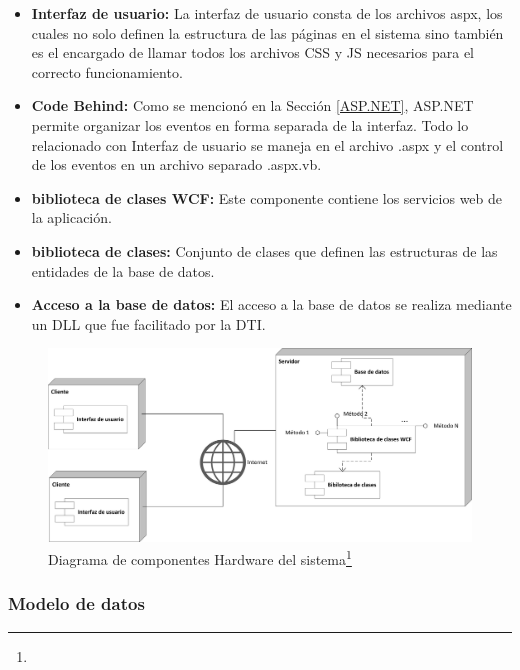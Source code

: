 	\begin{itemize}
		\item \textbf{Interfaz de usuario:} La interfaz de usuario  consta de los archivos aspx, los cuales no solo definen la estructura de las páginas en el sistema sino también  es el encargado de llamar todos los archivos CSS y JS necesarios para el correcto funcionamiento.
		
		
		\item \textbf{Code Behind:} Como se mencionó en la Sección \ref{ASP.NET}, ASP.NET permite organizar  los eventos  en forma separada de la interfaz. Todo lo relacionado con Interfaz de usuario se maneja en el archivo .aspx y el control de los eventos en un archivo separado .aspx.vb.
		
		\item \textbf{biblioteca de clases WCF:} Este componente contiene los servicios web de la aplicación.
		
		\item \textbf{biblioteca de clases:} Conjunto de clases que definen las estructuras de las  entidades de la base de datos.
		
		\item \textbf{Acceso a la base de datos:} El acceso a la base de datos se realiza  mediante un DLL que fue facilitado por la DTI.
	\end{itemize}		
			
		\begin{figure}[H]
			\centering
			\includegraphics[width=1\textwidth]{images/Capitulo_3/Componente_HW.png}
			\caption[Diagrama de componentes Hardware del sistema]{Diagrama de componentes Hardware del sistema\footnote{}}
			\label{diagrama_Componente_HW}
		\end{figure}
		
	\subsubsection{Modelo de datos}
	
